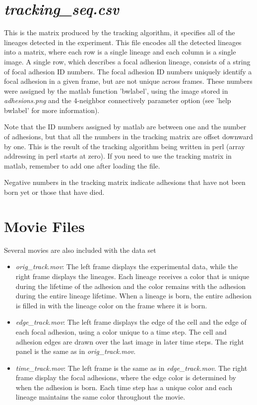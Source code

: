 \documentclass[letterpaper]{article}
\begin{document}
\section*{\emph{tracking\_seq.csv}}

This is the matrix produced by the tracking algorithm, it specifies all of the lineages detected in the experiment. This file encodes all the detected lineages into a matrix, where each row is a single lineage and each column is a single image. A single row, which describes a focal adhesion lineage, consists of a string of focal adhesion ID numbers. The focal adhesion ID numbers uniquely identify a focal adhesion in a given frame, but are not unique across frames. These numbers were assigned by the matlab function 'bwlabel', using the image stored in \emph{adhesions.png} and the 4-neighbor connectively parameter option (see 'help bwlabel' for more information). 

Note that the ID numbers assigned by matlab are between one and the number of adhesions, but that all the numbers in the tracking matrix are offset downward by one. This is the result of the tracking algorithm being written in perl (array addressing in perl starts at zero). If you need to use the tracking matrix in matlab, remember to add one after loading the file.

Negative numbers in the tracking matrix indicate adhesions that have not been born yet or those that have died.

\section*{Movie Files}
Several movies are also included with the data set

\begin{itemize}
\item \emph{orig\_track.mov}: The left frame displays the experimental data, while the right frame displays the lineages. Each lineage receives a color that is unique during the lifetime of the adhesion and the color remains with the adhesion during the entire lineage lifetime. When a lineage is born, the entire adhesion is filled in with the lineage color on the frame where it is born.

\item \emph{edge\_track.mov}: The left frame displays the edge of the cell and the edge of each focal adhesion, using a color unique to a time step. The cell and adhesion edges are drawn over the last image in later time steps. The right panel is the same as in \emph{orig\_track.mov}.

\item \emph{time\_track.mov}: The left frame is the same as in \emph{edge\_track.mov}. The right frame display the focal adhesions, where the edge color is determined by when the adhesion is born. Each time step has a unique color and each lineage maintains the same color throughout the movie.
\end{itemize}
\end{document}
